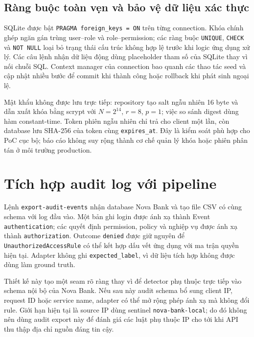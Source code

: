\subsection{Ràng buộc toàn vẹn và bảo vệ dữ liệu xác thực}

SQLite được bật \texttt{PRAGMA foreign\_keys = ON} trên từng connection. Khóa
chính ghép ngăn gán trùng user--role và role--permission; các ràng buộc
\texttt{UNIQUE}, \texttt{CHECK} và \texttt{NOT NULL} loại bỏ trạng thái cấu
trúc không hợp lệ trước khi logic ứng dụng xử lý. Các câu lệnh nhận dữ liệu động
dùng placeholder tham số của SQLite thay vì nối chuỗi SQL. Context manager của
connection bao quanh các thao tác seed và cập nhật nhiều bước để commit khi
thành công hoặc rollback khi phát sinh ngoại lệ.

Mật khẩu không được lưu trực tiếp: repository tạo salt ngẫu nhiên 16 byte và
dẫn xuất khóa bằng scrypt với $N=2^{14}$, $r=8$, $p=1$; việc so sánh digest dùng
hàm constant-time. Token phiên ngẫu nhiên chỉ trả cho client một lần, còn
database lưu SHA-256 của token cùng \texttt{expires\_at}. Đây là kiểm soát phù
hợp cho PoC cục bộ; báo cáo không suy rộng thành cơ chế quản lý khóa hoặc phiên
phân tán ở môi trường production.

\section{Tích hợp audit log với pipeline}

Lệnh \texttt{export-audit-events} nhận database Nova Bank và tạo file CSV có
cùng schema với log đầu vào. Một bản ghi login được ánh xạ thành Event
\texttt{authentication}; các quyết định permission, policy và nghiệp vụ được
ánh xạ thành \texttt{authorization}. Outcome \texttt{denied} được giữ nguyên
để \texttt{UnauthorizedAccessRule} có thể kết hợp dấu vết ứng dụng với ma trận
quyền hiện tại. Adapter không ghi \texttt{expected\_label}, vì dữ liệu tích hợp
không được dùng làm ground truth.

Thiết kế này tạo một seam rõ ràng thay vì để detector phụ thuộc trực tiếp vào
schema nội bộ của Nova Bank. Nếu sau này audit schema bổ sung client IP, request
ID hoặc service name, adapter có thể mở rộng phép ánh xạ mà không đổi rule.
Giới hạn hiện tại là source IP dùng sentinel \texttt{nova-bank-local}; do đó
không nên dùng audit export này để đánh giá các luật phụ thuộc IP cho tới khi
API thu thập địa chỉ nguồn đáng tin cậy.

